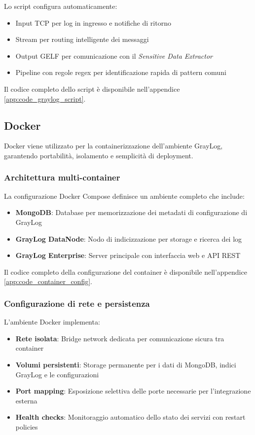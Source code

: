 \documentclass[12pt]{report}
\begin{document}
Lo script configura automaticamente:
\begin{itemize}
    \item Input TCP per log in ingresso e notifiche di ritorno
    \item Stream per routing intelligente dei messaggi
    \item Output GELF per comunicazione con il \textit{Sensitive Data Extractor}
    \item Pipeline con regole regex per identificazione rapida di pattern comuni
\end{itemize}

Il codice completo dello script è disponibile nell'appendice \ref{app:code_graylog_script}.

\subsection{Docker}
\label{subsec:docker}

Docker viene utilizzato per la containerizzazione dell'ambiente GrayLog, garantendo portabilità, isolamento e semplicità di deployment.

\subsubsection{Architettura multi-container}
La configurazione Docker Compose definisce un ambiente completo che include:

\begin{itemize}
    \item \textbf{MongoDB}: Database per memorizzazione dei metadati di configurazione di GrayLog
    \item \textbf{GrayLog DataNode}: Nodo di indicizzazione per storage e ricerca dei log
    \item \textbf{GrayLog Enterprise}: Server principale con interfaccia web e API REST
\end{itemize}

Il codice completo della configurazione del container è disponibile nell'appendice \ref{app:code_container_config}.

\subsubsection{Configurazione di rete e persistenza}
L'ambiente Docker implementa:

\begin{itemize}
    \item \textbf{Rete isolata}: Bridge network dedicata per comunicazione sicura tra container
    \item \textbf{Volumi persistenti}: Storage permanente per i dati di MongoDB, indici GrayLog e le configurazioni
    \item \textbf{Port mapping}: Esposizione selettiva delle porte necessarie per l'integrazione esterna
    \item \textbf{Health checks}: Monitoraggio automatico dello stato dei servizi con restart policies
\end{itemize}
\end{document}
